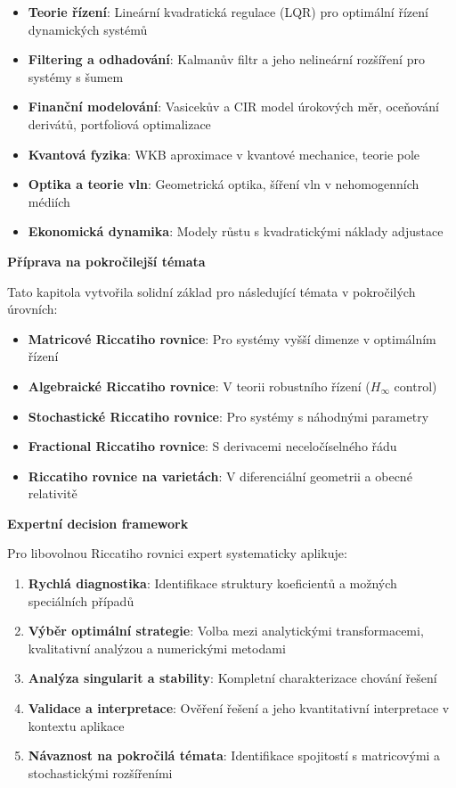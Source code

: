 \begin{itemize}
\item \textbf{Teorie řízení}: Lineární kvadratická regulace (LQR) pro optimální řízení dynamických systémů
\item \textbf{Filtering a odhadování}: Kalmanův filtr a jeho nelineární rozšíření pro systémy s šumem
\item \textbf{Finanční modelování}: Vasicekův a CIR model úrokových měr, oceňování derivátů, portfoliová optimalizace
\item \textbf{Kvantová fyzika}: WKB aproximace v kvantové mechanice, teorie pole
\item \textbf{Optika a teorie vln}: Geometrická optika, šíření vln v nehomogenních médiích
\item \textbf{Ekonomická dynamika}: Modely růstu s kvadratickými náklady adjustace
\end{itemize}

\vspace{1\baselineskip}

\noindent\textbf{Příprava na pokročilejší témata}

Tato kapitola vytvořila solidní základ pro následující témata v pokročilých úrovních:
\begin{itemize}
\item \textbf{Matricové Riccatiho rovnice}: Pro systémy vyšší dimenze v optimálním řízení
\item \textbf{Algebraické Riccatiho rovnice}: V teorii robustního řízení ($H_\infty$ control)
\item \textbf{Stochastické Riccatiho rovnice}: Pro systémy s náhodnými parametry
\item \textbf{Fractional Riccatiho rovnice}: S derivacemi neceločíselného řádu
\item \textbf{Riccatiho rovnice na varietách}: V diferenciální geometrii a obecné relativitě
\end{itemize}

\vspace{1\baselineskip}

\noindent\textbf{Expertní decision framework}

Pro libovolnou Riccatiho rovnici expert systematicky aplikuje:
\begin{enumerate}
\item \textbf{Rychlá diagnostika}: Identifikace struktury koeficientů a možných speciálních případů
\item \textbf{Výběr optimální strategie}: Volba mezi analytickými transformacemi, kvalitativní analýzou a numerickými metodami
\item \textbf{Analýza singularit a stability}: Kompletní charakterizace chování řešení
\item \textbf{Validace a interpretace}: Ověření řešení a jeho kvantitativní interpretace v kontextu aplikace
\item \textbf{Návaznost na pokročilá témata}: Identifikace spojitostí s matricovými a stochastickými rozšířeními
\end{enumerate}


